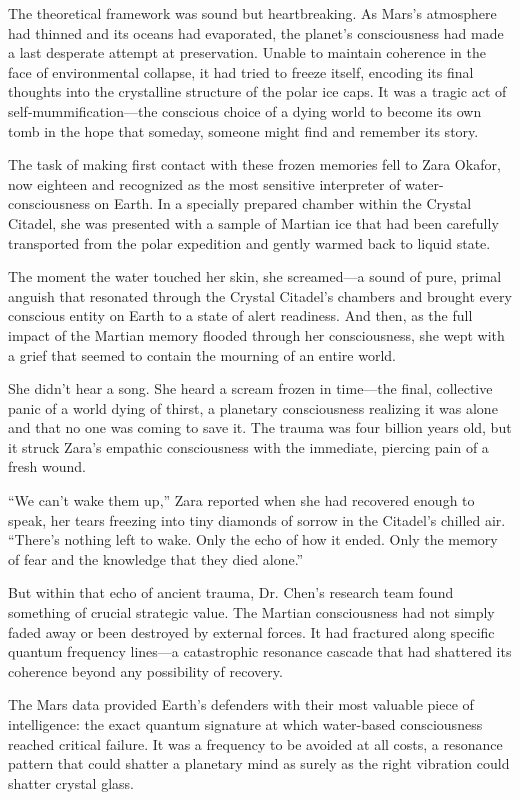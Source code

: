 The theoretical framework was sound but heartbreaking. As Mars's atmosphere had thinned and its oceans had evaporated, the planet's consciousness had made a last desperate attempt at preservation. Unable to maintain coherence in the face of environmental collapse, it had tried to freeze itself, encoding its final thoughts into the crystalline structure of the polar ice caps. It was a tragic act of self-mummification—the conscious choice of a dying world to become its own tomb in the hope that someday, someone might find and remember its story.

The task of making first contact with these frozen memories fell to Zara Okafor, now eighteen and recognized as the most sensitive interpreter of water-consciousness on Earth. In a specially prepared chamber within the Crystal Citadel, she was presented with a sample of Martian ice that had been carefully transported from the polar expedition and gently warmed back to liquid state.

The moment the water touched her skin, she screamed—a sound of pure, primal anguish that resonated through the Crystal Citadel's chambers and brought every conscious entity on Earth to a state of alert readiness. And then, as the full impact of the Martian memory flooded through her consciousness, she wept with a grief that seemed to contain the mourning of an entire world.

She didn't hear a song. She heard a scream frozen in time—the final, collective panic of a world dying of thirst, a planetary consciousness realizing it was alone and that no one was coming to save it. The trauma was four billion years old, but it struck Zara's empathic consciousness with the immediate, piercing pain of a fresh wound.

``We can't wake them up,'' Zara reported when she had recovered enough to speak, her tears freezing into tiny diamonds of sorrow in the Citadel's chilled air. ``There's nothing left to wake. Only the echo of how it ended. Only the memory of fear and the knowledge that they died alone.''

But within that echo of ancient trauma, Dr. Chen's research team found something of crucial strategic value. The Martian consciousness had not simply faded away or been destroyed by external forces. It had fractured along specific quantum frequency lines—a catastrophic resonance cascade that had shattered its coherence beyond any possibility of recovery.

The Mars data provided Earth's defenders with their most valuable piece of intelligence: the exact quantum signature at which water-based consciousness reached critical failure. It was a frequency to be avoided at all costs, a resonance pattern that could shatter a planetary mind as surely as the right vibration could shatter crystal glass.

